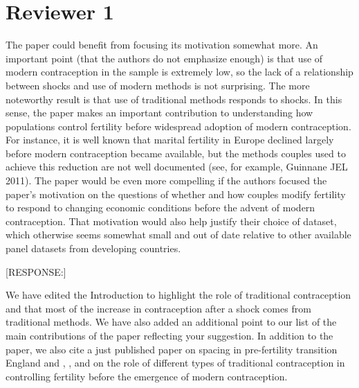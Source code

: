 \documentclass[letterpaper,12pt]{article}
\begin{document}
\newpage

\section*{Reviewer 1}


The paper could benefit from focusing its motivation somewhat more. An
important point (that the authors do not emphasize enough) is that use
of modern contraception in the sample is extremely low, so the lack of a
relationship between shocks and use of modern methods is not surprising.
The more noteworthy result is that use of traditional methods responds
to shocks. In this sense, the paper makes an important contribution to
understanding how populations control fertility before widespread
adoption of modern contraception. For instance, it is well known that
marital fertility in Europe declined largely before modern contraception
became available, but the methods couples used to achieve this reduction
are not well documented (see, for example, Guinnane JEL 2011). The paper
would be even more compelling if the authors focused the paper's
motivation on the questions of whether and how couples modify fertility
to respond to changing economic conditions before the advent of
modern contraception. That motivation would also help justify their
choice of dataset, which otherwise seems somewhat small and out of date
relative to other available panel datasets from developing countries.

[RESPONSE:]

We have edited the Introduction to highlight the role of traditional 
contraception and that most of the increase in contraception after a 
shock comes from traditional methods.
We have also added an additional point to our list of the main 
contributions of the paper reflecting your suggestion.
In addition to the \citet{Guinnane2011} paper, we also cite a just
published paper on spacing in pre-fertility transition England
\citep{Cinnirella2017} and \citet{Michael1976}, \citet{David1986},
and \citet{Santow1995}
on the role of different types of traditional contraception in
controlling fertility before the emergence of modern contraception.
\end{document}
